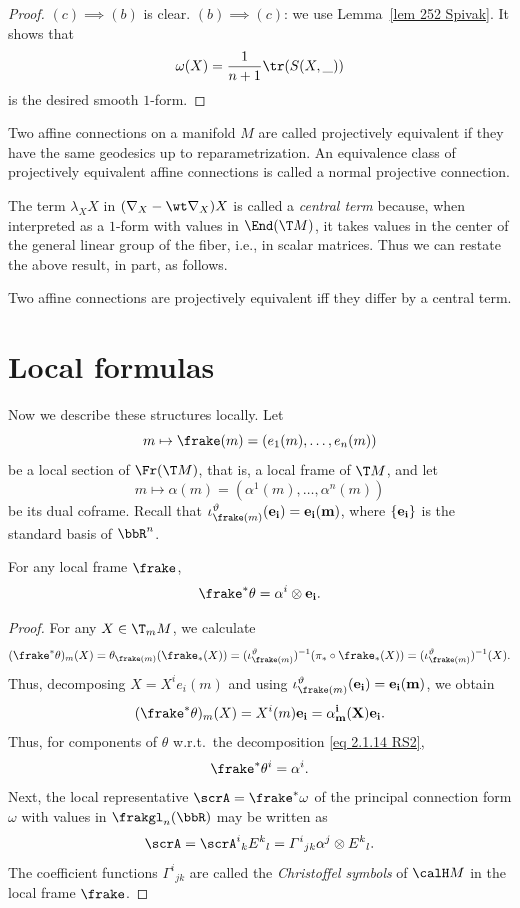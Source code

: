 \begin{proof}
    $(c)\implies (b)$ is clear. $(b)\implies(c)$: we use Lemma~\ref{lem 252 Spivak}. It shows that 
    \[\omega(X)=\frac{1}{n+1}\tr (S(X,\_))\]
    is the desired smooth $1$-form.
\end{proof}

\begin{defn}
    Two affine connections on a manifold $M$ are called projectively equivalent if they have the same geodesics up to reparametrization. An equivalence class of projectively equivalent affine connections is called a normal projective connection.
\end{defn}

The term $\lambda_X X$ in $(\nabla_X -\wt\nabla_X)X$ is called a \emph{central term} because, when interpreted as a $1$-form with values in $\End(\T M)$, it takes values in the center of the general linear group of the fiber, i.e., in scalar matrices. Thus we can restate the above result, in part, as follows.

\begin{cor}
    Two affine connections are projectively equivalent iff they differ by a central term.
\end{cor}







\section{Local formulas}


Now we describe these structures locally. Let
\[m\mapsto \frake(m)=(e_1(m),\ldots,e_n(m))\]
be a local section of $\Fr(\T M)$, that is, a local frame of $\T M$, and let 
\[m\mapsto \alpha(m)=(\alpha^1(m),\ldots,\alpha^n(m))\]
be its dual coframe. Recall that $\iota^\vartheta_{\frake(m)}(\bf{e}_i)=e_i(m)$, where $\{\bf{e}_i\}$ is the standard basis of $\bbR^n$.

\begin{lem}[{{\cite[Lem.~2.1.26]{RS2}}}]\label{lem 2.1.26 RS2}
    For any local frame $\frake$,
    \[\frake^\ast \theta=\alpha^i\otimes\bf{e}_i.\]
\end{lem}
\begin{proof}
    For any $X\in \T_mM$, we calculate 
    \[(\frake^\ast \theta)_m(X)=\theta_{\frake(m)}(\frake_\ast(X))=(\iota^\vartheta_{\frake(m)})^{-1}(\pi_\ast\circ\frake_\ast(X))=(\iota^\vartheta_{\frake(m)})^{-1}(X).\]
    Thus, decomposing $X=X^ie_i(m)$ and using $\iota^\vartheta_{\frake(m)}(\bf{e}_i)=e_i(m)$, we obtain
    \[(\frake^\ast\theta)_m(X)=X^i(m)\bf{e}_i=\alpha^i_m(X)\bf{e}_i.\]
    Thus, for components of $\theta$ w.r.t.\ the decomposition \eqref{eq 2.1.14 RS2},
    \[\frake^\ast \theta^i=\alpha^i.\]
    Next, the local representative $\scrA=\frake^\ast\omega$ of the principal connection form $\omega$ with values in $\frakgl_n(\bbR)$ may be written as 
    \[\scrA=\scrA^i{}_k E^k{}_l=\varGamma^i{}_{jk}\alpha^j\otimes E^k{}_l.\label{eq 2.1.39 RS2}\]
    The coefficient functions $\varGamma^i{}_{jk}$ are called the \emph{Christoffel symbols} of $\calH M$ in the local frame $\frake$.
\end{proof}

